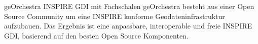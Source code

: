 %
{geOrchestra}%
{INSPIRE GDI mit Fachschalen}%
{
geOrchestra besteht aus einer Open Source Community um eine INSPIRE konforme Geodateninfrastruktur aufzubauen. Das Ergebnis ist eine anpassbare, interoperable und freie INSPIRE GDI, basierend auf den besten Open Source Komponenten.%
}

\label{bof-mittwoch}

\label{bof-mittwoch}
